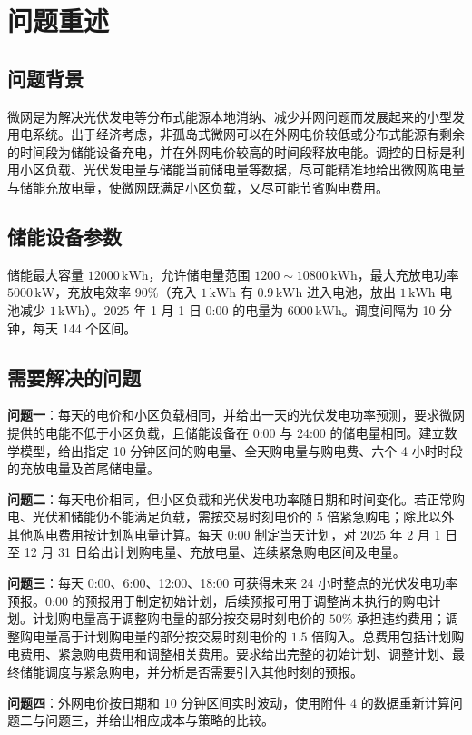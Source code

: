 \section{问题重述}

\subsection{问题背景}

微网是为解决光伏发电等分布式能源本地消纳、减少并网问题而发展起来的小型发用电系统。出于经济考虑，非孤岛式微网可以在外网电价较低或分布式能源有剩余的时间段为储能设备充电，并在外网电价较高的时间段释放电能。调控的目标是利用小区负载、光伏发电量与储能当前储电量等数据，尽可能精准地给出微网购电量与储能充放电量，使微网既满足小区负载，又尽可能节省购电费用。

\subsection{储能设备参数}

储能最大容量 $12000\,\mathrm{kWh}$，允许储电量范围 $1200\sim10800\,\mathrm{kWh}$，最大充放电功率 $5000\,\mathrm{kW}$，充放电效率 $90\%$（充入 $1\,\mathrm{kWh}$ 有 $0.9\,\mathrm{kWh}$ 进入电池，放出 $1\,\mathrm{kWh}$ 电池减少 $1\,\mathrm{kWh}$）。2025 年 1 月 1 日 0:00 的电量为 $6000\,\mathrm{kWh}$。调度间隔为 10 分钟，每天 144 个区间。

\subsection{需要解决的问题}

\textbf{问题一}：每天的电价和小区负载相同，并给出一天的光伏发电功率预测，要求微网提供的电能不低于小区负载，且储能设备在 0:00 与 24:00 的储电量相同。建立数学模型，给出指定 10 分钟区间的购电量、全天购电量与购电费、六个 4 小时时段的充放电量及首尾储电量。

\textbf{问题二}：每天电价相同，但小区负载和光伏发电功率随日期和时间变化。若正常购电、光伏和储能仍不能满足负载，需按交易时刻电价的 5 倍紧急购电；除此以外其他购电费用按计划购电量计算。每天 0:00 制定当天计划，对 2025 年 2 月 1 日至 12 月 31 日给出计划购电量、充放电量、连续紧急购电区间及电量。

\textbf{问题三}：每天 0:00、6:00、12:00、18:00 可获得未来 24 小时整点的光伏发电功率预报。0:00 的预报用于制定初始计划，后续预报可用于调整尚未执行的购电计划。计划购电量高于调整购电量的部分按交易时刻电价的 $50\%$ 承担违约费用；调整购电量高于计划购电量的部分按交易时刻电价的 $1.5$ 倍购入。总费用包括计划购电费用、紧急购电费用和调整相关费用。要求给出完整的初始计划、调整计划、最终储能调度与紧急购电，并分析是否需要引入其他时刻的预报。

\textbf{问题四}：外网电价按日期和 10 分钟区间实时波动，使用附件 4 的数据重新计算问题二与问题三，并给出相应成本与策略的比较。

